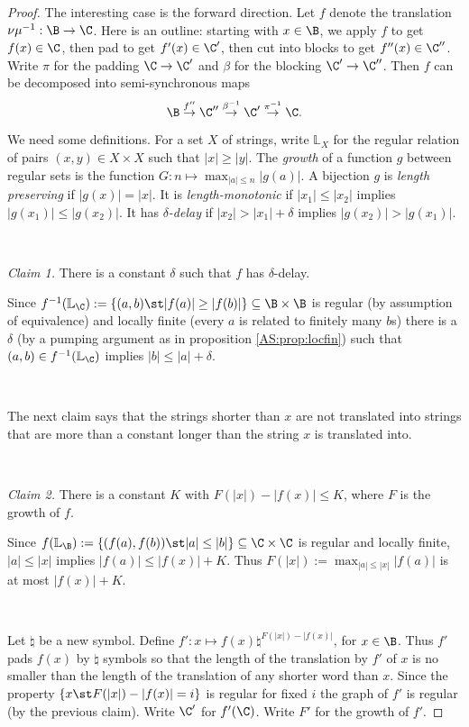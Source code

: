 \begin{proof}
The interesting case is the forward direction. Let $f$ denote the translation $\nu\mu^{-1}:\B \to \C$. 
Here is an outline: starting with $x \in \B$, we apply $f$ to get $f(x) \in \C$, then pad to get $f'(x) \in \C'$,
then cut into blocks to get $f''(x) \in \C''$. 
Write $\pi$ for the padding $\C \to \C'$ and $\beta$ for the blocking $\C' \to \C''$.
Then $f$ can be decomposed into semi-synchronous maps
\[
 \B \stackrel{f''}{\to} \C'' \stackrel{\beta^{-1}}{\to} \C' \stackrel{\pi^{-1}}{\to} \C.
\]

We need some definitions. 
For a set $X$ of strings, write $\mathbb{L}_X$ for the regular relation of pairs $(x,y) \in X \times X$ such that $|x| \geq |y|$. 
The {\em growth} of a function $g$ between regular sets is the function 
$G:n \mapsto \max_{|a| \leq n} |g(a)|$. A bijection $g$ is {\em length preserving} if $|g(x)| = |x|$.
It is {\em length-monotonic} if $|x_1| \leq |x_2|$ implies $|g(x_1)| \leq |g(x_2)|$. It has {\em $\delta$-delay} 
if $|x_2| > |x_1| + \delta$ implies $|g(x_2)| > |g(x_1)|$.


\

\noindent
{\em Claim 1.} There is a constant $\delta$ such that $f$ has $\delta$-delay.

Since $f^{-1}(\mathbb{L}_\C) := \{(a,b) \st |f(a)| \geq |f(b)|\} \subseteq \B \times \B$ is regular (by assumption of equivalence) and locally finite (every $a$ is related to finitely many $b$s) 
there is a $\delta$ (by a pumping argument as in proposition \ref{AS:prop:locfin}) such that $(a,b) \in f^{-1}(\mathbb{L}_\C)$ implies $|b| \leq |a| + \delta$.

\

The next claim says that the strings shorter than $x$ are not translated into strings that are more than a constant longer than the string $x$ is translated into.

\

\noindent
{\em Claim 2.} There is a constant $K$ with $F(|x|) - |f(x)| \leq K$, where $F$ is the growth of $f$.

Since $f(\mathbb{L}_\B) := \{(f(a),f(b)) \st |a| \leq |b|\} \subseteq \C \times \C$ is regular and locally finite, $|a| \leq |x|$ implies $|f(a)| \leq |f(x)| + K$. Thus
$F(|x|) := \max_{|a| \leq |x|} |f(a)|$ is at most $|f(x)| + K$.

\

Let $\natural$ be a new symbol. Define $f':x \mapsto f(x) \natural^{F(|x|) - |f(x)|}$, for $x \in \B$. Thus $f'$ pads 
$f(x)$ by $\natural$ symbols so that the length of the translation by $f'$ of $x$ is no smaller than the length of the translation of any shorter word than $x$. 
Since the property $\{x \st F(|x|)-|f(x)| = i\}$ is regular for fixed $i$
 the graph of $f'$ is regular (by the previous claim). Write $\C'$ for $f'(\C)$. Write $F'$ for the growth of $f'$.


\end{proof}
